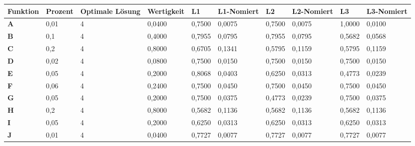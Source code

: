 \documentclass[10pt,a4paper]{article}
\begin{document}
\hspace*{-0.45in} %
\begin{tabular}{>{\bfseries}p{1.5cm} p{1.5cm} p{1.5cm} p{1.5cm} p{1.5cm} p{1.5cm} p{1.5cm} p{1.5cm} p{1.5cm} p{1.5cm}}
    \toprule
    Funktion                       & Prozent        & Optimale Lösung & Wertigkeit      & L1     & L1-Nomiert      & L2     & L2-Nomiert      & L3     & L3-Nomiert      \\
    \midrule
    A                              & 0,01           & 4               & 0,0400          & 0,7500 & 0,0075          & 0,7500 & 0,0075          & 1,0000 & 0,0100          \\
    B                              & 0,1            & 4               & 0,4000          & 0,7955 & 0,0795          & 0,7955 & 0,0795          & 0,5682 & 0,0568          \\
    C                              & 0,2            & 4               & 0,8000          & 0,6705 & 0,1341          & 0,5795 & 0,1159          & 0,5795 & 0,1159          \\
    D                              & 0,02           & 4               & 0,0800          & 0,7500 & 0,0150          & 0,7500 & 0,0150          & 0,7500 & 0,0150          \\
    E                              & 0,05           & 4               & 0,2000          & 0,8068 & 0,0403          & 0,6250 & 0,0313          & 0,4773 & 0,0239          \\
    F                              & 0,06           & 4               & 0,2400          & 0,7500 & 0,0450          & 0,7500 & 0,0450          & 0,7500 & 0,0450          \\
    G                              & 0,05           & 4               & 0,2000          & 0,7500 & 0,0375          & 0,4773 & 0,0239          & 0,7500 & 0,0375          \\
    H                              & 0,2            & 4               & 0,8000          & 0,5682 & 0,1136          & 0,5682 & 0,1136          & 0,5682 & 0,1136          \\
    I                              & 0,05           & 4               & 0,2000          & 0,6250 & 0,0313          & 0,6250 & 0,0313          & 0,6250 & 0,0313          \\
    J                              & 0,01           & 4               & 0,0400          & 0,7727 & 0,0077          & 0,7727 & 0,0077          & 0,7727 & 0,0077          \\

\end{tabular}
\end{document}

